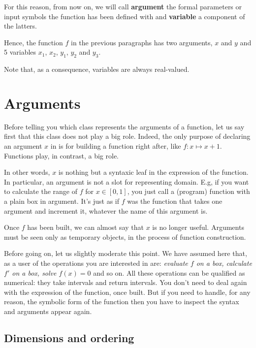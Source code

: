 For this reason, from now on, we will call {\bf argument} the formal parameters
or input symbols the function has been defined with and {\bf variable} a component of the
latters. 

Hence, the function $f$ in the previous paragraphs has two arguments, $x$ and $y$
and 5 variables $x_1$, $x_2$, $y_1$, $y_2$ and $y_3$.

Note that, as a consequence, variables are always real-valued.

\section{Arguments}

Before telling you which class represents the arguments of a function, let us say first that
this class does not play a big role.
Indeed, the only purpose of declaring an argument $x$ in \ibex is
for building a function right after, like $f:x\mapsto x+1$.
Functions play, in contrast, a big role.

In other words, $x$ is nothing but a syntaxic leaf in the expression 
of the function. In particular, an argument is not a slot for
representing domain. %
E.g, if you want to calculate the range of $f$ for $x\in [0,1]$,
you just call a (program) function  with a plain box in argument.
It's just as if $f$ was the function that takes one argument and
increment it, whatever the name of this argument is.

Once $f$ has been built, we can almost say that $x$ is no longer useful.
Arguments must be seen only as temporary objects, in the process of function construction.

Before going on, let us slightly moderate this point.
We have assumed here that, as a user of \ibex the operations you are interested in are: {\it evaluate $f$ on a box, 
calculate $f'$ on a box, solve $f(x)=0$} and so on. All these operations can be qualified as numerical: they take
intervals and return intervals. You don't need to deal again with the expression of the function, once built.
But if you need to handle, for any reason, the symbolic form of the function then you have to inspect the syntax
and arguments appear again.

\subsection{Dimensions and ordering}

